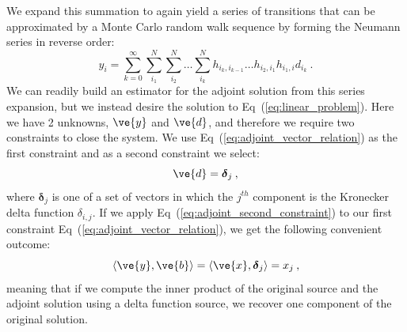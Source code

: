 \documentclass[letterpaper,11pt]{article}
\begin{document}
We expand this summation to again yield a series of transitions that
can be approximated by a Monte Carlo random walk sequence by forming
the Neumann series in reverse order:
\begin{equation}
  y_i = \sum_{k=0}^{\infty}\sum_{i_1}^{N}\sum_{i_2}^{N}\ldots
  \sum_{i_k}^{N}h_{i_k,i_{k-1}}\ldots h_{i_2,i_1} h_{i_1,i} d_{i_k}\:.
  \label{eq:adjoint_neumann_solution}
\end{equation}
We can readily build an estimator for the adjoint solution from this
series expansion, but we instead desire the solution to
Eq~(\ref{eq:linear_problem}). Here we have 2 unknowns, $\ve{y}$ and
$\ve{d}$, and therefore we require two constraints to close the
system. We use Eq~(\ref{eq:adjoint_vector_relation}) as the first
constraint and as a second constraint we select:
\begin{equation}
  \ve{d} = \boldsymbol{\delta}_j\:,
  \label{eq:adjoint_second_constraint}
\end{equation}
where $\boldsymbol{\delta}_j$ is one of a set of vectors in which the
$j^{th}$ component is the Kronecker delta function $\delta_{i,j}$. If
we apply Eq~(\ref{eq:adjoint_second_constraint}) to our first
constraint Eq~(\ref{eq:adjoint_vector_relation}), we get the following
convenient outcome:
\begin{equation}
  \langle \ve{y}, \ve{b} \rangle = \langle \ve{x},
  \boldsymbol{\delta}_j \rangle = x_j \:,
  \label{eq:inner_product_constraint}
\end{equation}
meaning that if we compute the inner product of the original source
and the adjoint solution using a delta function source, we recover one
component of the original solution.
\end{document}
